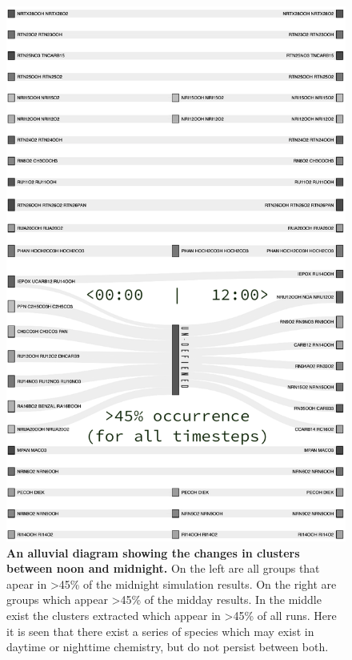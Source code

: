 \begin{figure}%
    \centering
\includegraphics[width=.9\textwidth]{fig/alluvial.png}
\caption{\textbf{An alluvial diagram showing the changes in clusters between noon and midnight.} On the left are all groups that apear in >45\% of the midnight simulation results. On the right are groups which appear >45\% of the midday results. In the middle exist the clusters extracted which appear in >45\% of all runs. Here it is seen that there exist a series of species which may exist in daytime or nighttime chemistry, but do not persist between both. }
\label{fig:alluvial}
\end{figure}



